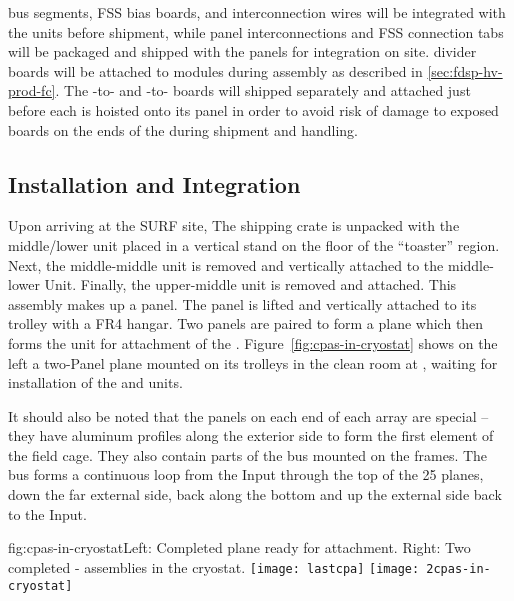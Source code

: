  bus segments, FSS bias boards, and  interconnection wires will be integrated with the  units before shipment, while  panel interconnections and FSS connection tabs will be packaged and shipped with the  panels for integration on site.
 divider boards will be attached to  modules during  assembly as described in \ref{sec:fdsp-hv-prod-fc}.
The -to- and -to- boards will shipped separately and attached just before each  is hoisted onto its  panel in order to avoid risk of damage to exposed boards on the ends of the  during shipment and handling.


\subsection{Installation and Integration}
\label{sec:fdsp-hv-integration}
Upon arriving at the SURF site, The  shipping crate is unpacked with the middle/lower  unit placed in a vertical stand on the floor of the ``toaster'' region.  Next, the middle-middle  unit is removed and vertically attached to the middle-lower Unit.  Finally, the upper-middle  unit is removed and attached.  This assembly makes up a  panel.  The  panel is lifted and vertically attached to its trolley with a FR4 hangar.  Two  panels are paired to form a   plane which then forms the unit for attachment of the .  Figure~\ref{fig:cpas-in-cryostat} shows on the left a two-Panel  plane mounted on its trolleys in the clean room at , waiting for installation of the  and  units.

It should also be noted that the  panels on each end of each  array are special -- they have aluminum profiles along the exterior side to form the first element of the field cage.  They also contain parts of the  bus mounted on the  frames.  The  bus forms a continuous loop from the  Input through the top of the 25  planes, down the far external side, back along the bottom and up the  external side back to the  Input.

\begin{dunefigure}{fig:cpas-in-cryostat}{Left: Completed   plane ready for  attachment. Right: Two completed - assemblies in the  cryostat.}
\texttt{[image: lastcpa]}
\texttt{[image: 2cpas-in-cryostat]}
\end{dunefigure}

